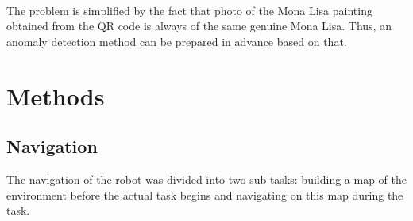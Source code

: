 \documentclass[a4paper,
  twoside, %
  headlines=2.1 %
  ]{scrartcl}
\begin{document}
\\
The problem is simplified by the fact that photo of the Mona Lisa painting obtained from the QR code is always of the same genuine Mona Lisa. Thus, an anomaly detection method can be prepared in advance based on that. 


\newpage

\section{Methods}
\subsection{Navigation}
The navigation of the robot was divided into two sub tasks: building a map of the environment before the actual task begins and navigating on this map during the task.
\end{document}
